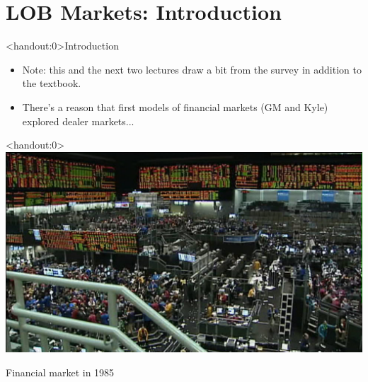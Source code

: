 \documentclass[english,10pt
,aspectratio=169
]{beamer}
\begin{document}



\section{LOB Markets: Introduction}

\begin{frame}<handout:0>{Introduction}
	\begin{itemize}
		\item Note: this and the next two lectures draw a bit from the \cite{parlour_limit_2008} survey in addition to the textbook.
		\item There's a reason that first models of financial markets (GM and Kyle) explored dealer markets...
	\end{itemize}
\end{frame}


\begin{frame}<handout:0>
	\centering
	\includegraphics[scale=0.5]{pics/mkt20}
	
	Financial market in 1985
\end{frame}
\end{document}
